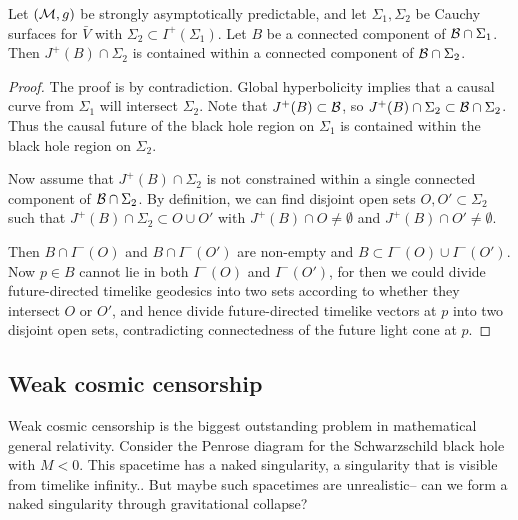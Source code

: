 \begin{thm}
    Let $(\mathcal{M},g)$ be strongly asymptotically predictable, and let $\Sigma_1,\Sigma_2$ be Cauchy surfaces for $\bar V$ with $\Sigma_2\subset I^+(\Sigma_1)$. Let $B$ be a connected component of $\mathcal{B} \cap \Sigma_1$. Then $J^+(B)\cap \Sigma_2$ is contained within a connected component of $\mathcal{B}\cap \Sigma_2$.
\end{thm}
\begin{proof}
    The proof is by contradiction. Global hyperbolicity implies that a causal curve from $\Sigma_1$ will intersect $\Sigma_2$. Note that $J^+(B)\subset \mathcal{B}$, so $J^+(B)\cap \Sigma_2 \subset \mathcal{B}\cap \Sigma_2$. Thus the causal future of the black hole region on $\Sigma_1$ is contained within the black hole region on $\Sigma_2$.
    
    Now assume that $J^+(B)\cap \Sigma_2$ is not constrained within a single connected component of $\mathcal{B} \cap \Sigma_2$. By definition, we can find disjoint open sets $O,O' \subset \Sigma_2$ such that $J^+(B) \cap \Sigma_2 \subset O\cup O'$ with $J^+(B)\cap O \neq \emptyset$ and $J^+(B)\cap O' \neq \emptyset$.
    
    Then $B \cap I^-(O)$ and $B \cap I^-(O')$ are non-empty and $B\subset I^-(O)\cup I^- (O')$. Now $p\in B$ cannot lie in both $I^-(O)$ and $I^-(O')$, for then we could divide future-directed timelike geodesics into two sets according to whether they intersect $O$ or $O'$, and hence divide future-directed timelike vectors at $p$ into two disjoint open sets, contradicting connectedness of the future light cone at $p.$
\end{proof}

\subsection*{Weak cosmic censorship}
Weak cosmic censorship is the biggest outstanding problem in mathematical general relativity. Consider the Penrose diagram for the Schwarzschild black hole with $M<0$. This spacetime has a naked singularity, a singularity that is visible from timelike infinity.. But maybe such spacetimes are unrealistic-- can we form a naked singularity through gravitational collapse?


